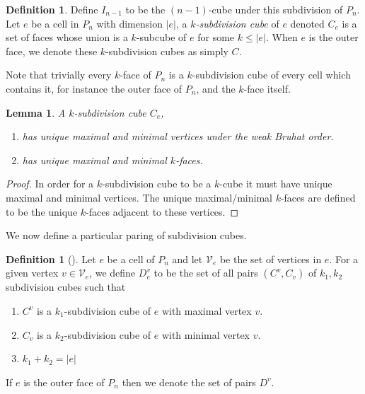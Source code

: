 \documentclass{amsart}
\newtheorem{lemma}[theorem]{Lemma}
\theoremstyle{definition}
\newtheorem{definition}[theorem]{Definition}
\newcommand{\subdivcubeofe}{C_e}
\newcommand{\subdivcubeofouter}{C}
\newcommand{\subdivpairsev}{D_e^v}
\newcommand{\subdivpairsv}{D^v}
\begin{document}
\begin{definition} \label{def:Subdivisions}
Define $I_{n-1}$ to be the $(n-1)$-cube under this subdivision of $P_{n}$. 
Let $e$ be a cell in $P_{n}$ with dimension $|e|$,  a \emph{$k$-subdivision cube} of $e$ denoted $\subdivcubeofe$ is a set of faces whose union is a $k$-subcube of $e$ for some $k\leq |e|$.
When $e$ is the outer face, we denote these $k$-subdivision cubes as simply $\subdivcubeofouter$.
\end{definition}
Note that trivially every $k$-face of $P_n$ is a $k$-subdivision cube of every cell which contains it, for instance the outer face of $P_n$, and the $k$-face itself. 

\begin{lemma}\label{lem:k-subdiv cubes have max/min k faces}
A $k$-subdivision cube $\subdivcubeofe$,
\begin{enumerate}
    \item has unique maximal and minimal vertices under the weak Bruhat order.
    \item has unique maximal and minimal $k$-faces.
\end{enumerate}
\end{lemma}

\begin{proof}
In order for a $k$-subdivision cube to be a $k$-cube it must have unique maximal and minimal vertices.
The unique maximal/minimal $k$-faces are defined to be the unique $k$-faces adjacent to these vertices.
\end{proof}

We now define a particular paring of subdivision cubes.

\begin{definition} [\cite{saneblidzeComparingDiagonalsAssociahedra2022}]\label{def:subdiv pairs}
Let $e$ be a cell of $P_n$ and let $\mathcal{V}_e$ be the set of vertices in $e$.
For a given vertex $v \in \mathcal{V}_e$, we define $\subdivpairsev$ to be the set of all pairs $(C^v,C_v)$ of $k_1,k_2$ subdivision cubes such that
\begin{enumerate}
    \item $C^v$ is a $k_1$-subdivision cube of $e$ with maximal vertex $v$.
    \item $C_v$ is a $k_2$-subdivision cube of $e$ with minimal vertex $v$.
    \item $k_1+k_2 = |e|$
\end{enumerate}
If $e$ is the outer face of $P_n$ then we denote the set of pairs $\subdivpairsv$.
\end{definition}
\end{document}
